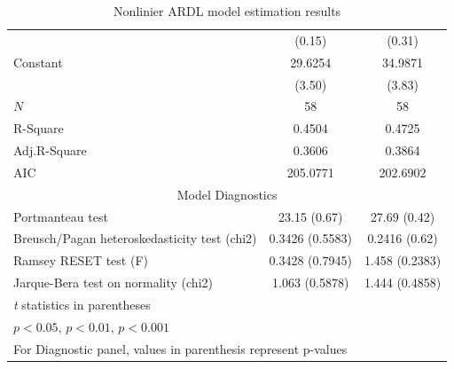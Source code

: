 \documentclass[a4paper,12pt]{article}
\begin{document}
\begin{table}[ht]
\begin{tabular}{l*{2}{c}}
			&      (0.15)         &      (0.31)         \\
			Constant      &     29.6254\sym{***}&     34.9871\sym{***}\\
			&      (3.50)         &      (3.83)         \\
			\hline
			\(N\)       &          58         &          58         \\
			R-Square    &      0.4504         &      0.4725         \\
			Adj.R-Square&      0.3606         &      0.3864         \\
			AIC         &    205.0771         &    202.6902         \\
			\hline\hline
			\multicolumn{3}{c}{Model Diagnostics} \\
			
			Portmanteau test			& 23.15 (0.67) &  27.69 (0.42)\\
			Breusch/Pagan heteroskedasticity test (chi2) & 0.3426 (0.5583)  & 0.2416 (0.62)  \\
			Ramsey RESET test (F)               &             0.3428 (0.7945)  & 1.458   (0.2383)   \\
			Jarque-Bera test on normality (chi2)   &          1.063 (0.5878)   &  1.444  (0.4858)  \\
			\hline\hline
			\multicolumn{3}{l}{\footnotesize \textit{t} statistics in parentheses} \\
			\multicolumn{3}{l}{\footnotesize \sym{*} \(p<0.05\), \sym{**} \(p<0.01\), \sym{***} \(p<0.001\)}\\
			\multicolumn{3}{l}{\footnotesize For Diagnostic panel, values in parenthesis represent p-values} \\
		\end{tabular}
		

	
	
	\caption{Nonlinier ARDL model estimation results}
	
\end{table}
\end{document}
